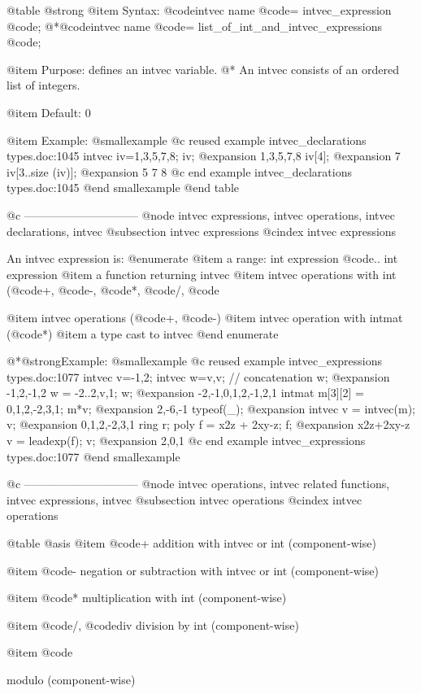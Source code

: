 {{{{@table @strong
@item Syntax:
@code{intvec} name @code{=} intvec_expression @code{;}
@*@code{intvec} name @code{=} list_of_int_and_intvec_expressions @code{;}

@item Purpose:
defines an intvec variable.
@* An intvec consists of an ordered list of integers.

@item Default:
0

@item Example:
@smallexample
@c reused example intvec_declarations types.doc:1045 
  intvec iv=1,3,5,7,8;
  iv;
@expansion{} 1,3,5,7,8
  iv[4];
@expansion{} 7
  iv[3..size (iv)];
@expansion{} 5 7 8
@c end example intvec_declarations types.doc:1045
@end smallexample
@end table

@c ------------------------------
@node intvec expressions, intvec operations, intvec declarations, intvec
@subsection intvec expressions
@cindex intvec expressions

An intvec expression is:
@enumerate
@item
a range: int expression @code{..} int expression
@item
a function returning intvec
@item
intvec operations with int (@code{+}, @code{-}, @code{*}, @code{/}, @code{%
@item
intvec operations (@code{+}, @code{-})
@item
intvec operation with intmat (@code{*})
@item
a type cast to intvec
@end enumerate

@*@strong{Example:}
@smallexample
@c reused example intvec_expressions types.doc:1077 
  intvec v=-1,2;
  intvec w=v,v;         // concatenation
  w;
@expansion{} -1,2,-1,2
  w = -2..2,v,1;
  w;
@expansion{} -2,-1,0,1,2,-1,2,1
  intmat m[3][2] = 0,1,2,-2,3,1;
  m*v;
@expansion{} 2,-6,-1
  typeof(_);
@expansion{} intvec
  v = intvec(m);
  v;
@expansion{} 0,1,2,-2,3,1
  ring r;
  poly f = x2z + 2xy-z;
  f;
@expansion{} x2z+2xy-z
  v = leadexp(f);
  v;
@expansion{} 2,0,1
@c end example intvec_expressions types.doc:1077
@end smallexample

@c ------------------------------
@node intvec operations, intvec related functions, intvec expressions, intvec
@subsection intvec operations
@cindex intvec operations

@table @asis
@item @code{+}
addition with intvec or int (component-wise)

@item @code{-}
negation or subtraction with intvec or int (component-wise)

@item @code{*}
multiplication with int (component-wise)

@item @code{/}, @code{div}
division by int (component-wise)

@item  @code{%
modulo (component-wise)

}}}}}}
